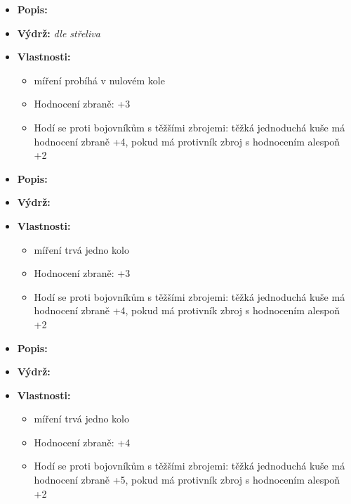 \documentclass[../main.tex]{subfiles}
\begin{document}
\begin{predmet}
\begin{itemize}
	\item \textbf{Popis:} 
	\item \textbf{Výdrž:} \emph{dle střeliva}
	\item \textbf{Vlastnosti:}
		\begin{itemize}
			\item míření probíhá v nulovém kole
			\item Hodnocení zbraně: +3
			\item Hodí se proti bojovníkům s těžšími zbrojemi: těžká jednoduchá kuše má hodnocení zbraně +4, pokud má protivník zbroj s hodnocením alespoň +2
		\end{itemize}
\end{itemize}
\end{predmet}

\begin{predmet}
\begin{itemize}
	\item \textbf{Popis:} 
	\item \textbf{Výdrž:} 
	\item \textbf{Vlastnosti:} 
		\begin{itemize}
			\item míření trvá jedno kolo
			\item Hodnocení zbraně: +3
			\item Hodí se proti bojovníkům s těžšími zbrojemi: těžká jednoduchá kuše má hodnocení zbraně +4, pokud má protivník zbroj s hodnocením alespoň +2
		\end{itemize}
\end{itemize}
\end{predmet}

\begin{predmet}
\begin{itemize}
	\item \textbf{Popis:} 
	\item \textbf{Výdrž:} 
	\item \textbf{Vlastnosti:} 
		\begin{itemize}
			\item míření trvá jedno kolo
			\item Hodnocení zbraně: +4
			\item Hodí se proti bojovníkům s těžšími zbrojemi: těžká jednoduchá kuše má hodnocení zbraně +5, pokud má protivník zbroj s hodnocením alespoň +2
		\end{itemize}
\end{itemize}
\end{predmet}
\end{document}

